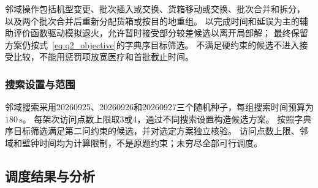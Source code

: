 \documentclass[bwprint]{gmcmthesis}
\begin{document}
邻域操作包括机型变更、批次插入或交换、货箱移动或交换、批次合并和拆分，
以及两个批次合并后重新分配货箱或按目的地重组。
以完成时间和延误为主的辅助评价函数驱动模拟退火，允许暂时接受部分较差候选以离开局部解；
最终保留方案仍按式~\eqref{eq:q2_objective}的字典序目标筛选。
不满足硬约束的候选不进入接受比较，不能用惩罚项放宽医疗和首批截止时间。

\subsubsection{搜索设置与范围}
邻域搜索采用20260925、20260926和20260927三个随机种子，每组搜索时间预算为$180\,\mathrm{s}$。
每架次访问点数上限取3或4，通过不同搜索设置构造候选方案。
按照字典序目标筛选满足第二问约束的候选，并对选定方案独立核验。
访问点数上限、邻域和壁钟时间均为计算限制，不是原题约束；未穷尽全部可行调度。

\subsection{调度结果与分析}
\end{document}
